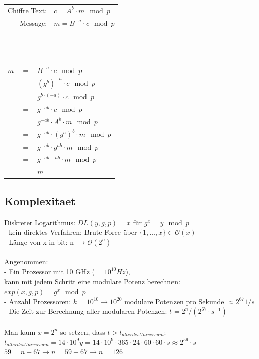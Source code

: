\documentclass[
  a4paper,
  11pt,
]{article}
\begin{document}
\begin{center}

\begin{tabular}{rl}
	Chiffre Text:	&	$c=A^b\cdot m\mod p$\\
	Message:		&	$m=B^{-a}\cdot c\mod p$\\
\end{tabular}

\ \\ \ \\

\begin{tabular}{rcl}
	$m$		&	$=$ &	$B^{-a}\cdot c\mod p$\\
			&	$=$	&	$(g^b)^{-a}\cdot c\mod p$\\
			&	$=$	&	$g^{b\cdot (-a)}\cdot c\mod p$\\			
			&	$=$	&	$g^{-ab}\cdot c\mod p$\\
			&	$=$	&	$g^{-ab}\cdot A^b\cdot m\mod p$\\
			&	$=$	&	$g^{-ab}\cdot (g^a)^b\cdot m\mod p$\\
			&	$=$	&	$g^{-ab}\cdot g^{ab}\cdot m\mod p$\\
			&	$=$	&	$g^{-ab+ab}\cdot m\mod p$\\
			&	$=$	&	$m$\\
\end{tabular}
\end{center}

\subsection*{Komplexitaet}
\label{sub:Komplexitaet}

Diskreter Logarithmus: $DL(y, g, p) = x$ für $g^x=y\mod p$\\
- kein direktes Verfahren: Brute Force über $\{1, \ldots, x\}\in \mathcal O(x)$\\
- Länge von x in bit: n $\rightarrow \mathcal O(2^n)$\\\\

Angenommen:\\
- Ein Prozessor mit 10 GHz ($= 10^{10}Hz$),\\
kann mit jedem Schritt eine modulare Potenz berechnen: $exp(x,g,p)=g^x\mod p$\\
- Anzahl Prozessoren: $k=10^{10} \rightarrow 10^{20}$ modulare Potenzen pro Sekunde $\approx 2^{67} 1/s$\\
- Die Zeit zur Berechnung aller modularen Potenzen: $t=2^n/(2^{67}\cdot s^{-1})$\\\\

Man kann $x=2^n$ so setzen, dass $t>t_{alter des Universum}$:\\
$t_{alter des Universum}=14\cdot 10^9y=14\cdot 10^9\cdot 365\cdot 24\cdot 60\cdot 60\cdot s\approx 2^{59}\cdot s$\\
$59=n-67\rightarrow n=59+67\rightarrow n=126$
\end{document}
